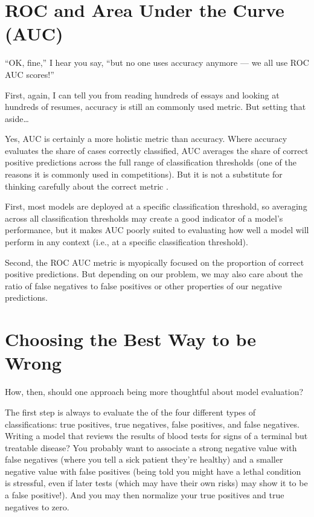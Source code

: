 \documentclass[letterpaper,10pt,english]{jupyterBook}
\begin{document}
\section{ROC and Area Under the Curve (AUC)}
\label{\detokenize{30_questions/26_passive_prediction_errors:roc-and-area-under-the-curve-auc}}
\sphinxAtStartPar
“OK, fine,” I hear you say, “but no one uses accuracy anymore — we all use ROC AUC scores!”

\sphinxAtStartPar
First, again, I can tell you from reading hundreds of essays and looking at hundreds of resumes, accuracy is still an  commonly used metric. But setting that aside…

\sphinxAtStartPar
Yes, AUC is certainly a more holistic metric than accuracy. Where accuracy evaluates the share of cases correctly classified, AUC averages the share of correct positive predictions across the full range of classification thresholds (one of the reasons it is commonly used in competitions). But it is not a substitute for thinking carefully about the correct metric .

\sphinxAtStartPar
First, most models are deployed at a specific classification threshold, so averaging across all classification thresholds may create a good  indicator of a model’s performance, but it makes AUC poorly suited to evaluating how well a model will perform in any  context (i.e., at a specific classification threshold).

\sphinxAtStartPar
Second, the ROC AUC metric is myopically focused on the proportion of correct positive predictions. But depending on our problem, we may also care about the ratio of false negatives to false positives or other properties of our negative predictions.


\section{Choosing the Best Way to be Wrong}
\label{\detokenize{30_questions/26_passive_prediction_errors:choosing-the-best-way-to-be-wrong}}
\sphinxAtStartPar
How, then, should one approach being more thoughtful about model evaluation?

\sphinxAtStartPar
The first step is always to evaluate the  of the four different types of classifications: true positives, true negatives, false positives, and false negatives. Writing a model that reviews the results of blood tests for signs of a terminal but treatable disease? You probably want to associate a strong negative value with false negatives (where you tell a sick patient they’re healthy) and a smaller negative value with false positives (being told you might have a lethal condition is stressful, even if later tests (which may have their own risks) may show it to be a false positive!). And you may then normalize your true positives and true negatives to zero.
\end{document}
